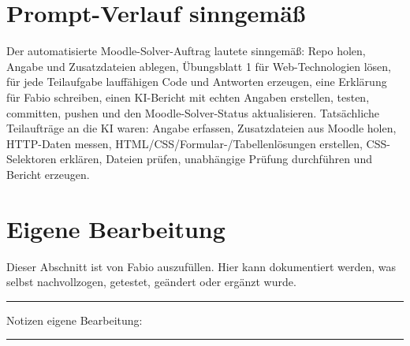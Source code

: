 \documentclass[11pt,a4paper]{article}
\begin{document}
\section*{Prompt-Verlauf sinngemäß}
Der automatisierte Moodle-Solver-Auftrag lautete sinngemäß: Repo holen, Angabe und Zusatzdateien ablegen, Übungsblatt 1 für Web-Technologien lösen, für jede Teilaufgabe lauffähigen Code und Antworten erzeugen, eine Erklärung für Fabio schreiben, einen KI-Bericht mit echten Angaben erstellen, testen, committen, pushen und den Moodle-Solver-Status aktualisieren. Tatsächliche Teilaufträge an die KI waren: Angabe erfassen, Zusatzdateien aus Moodle holen, HTTP-Daten messen, HTML/CSS/Formular-/Tabellenlösungen erstellen, CSS-Selektoren erklären, Dateien prüfen, unabhängige Prüfung durchführen und Bericht erzeugen.

\section*{Eigene Bearbeitung}
Dieser Abschnitt ist von Fabio auszufüllen. Hier kann dokumentiert werden, was selbst nachvollzogen, getestet, geändert oder ergänzt wurde.

\vspace{3cm}
\hrule
\vspace{0.4cm}
Notizen eigene Bearbeitung:

\vspace{4cm}
\hrule
\end{document}
